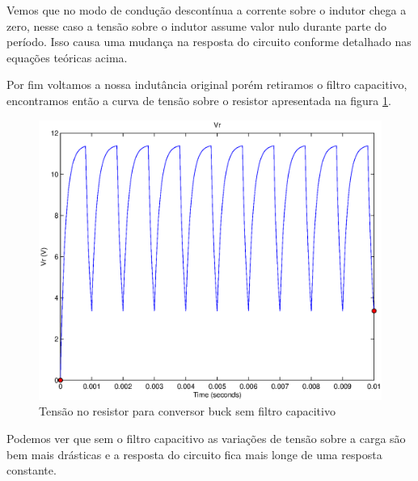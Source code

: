 \documentclass{article}
\begin{document}
Vemos que no modo de condução descontínua a corrente sobre o indutor chega a zero, nesse caso a tensão sobre o indutor assume valor nulo durante parte do período. Isso causa uma mudança na resposta do circuito conforme detalhado nas equações teóricas acima.

Por fim voltamos a nossa indutância original porém retiramos o filtro capacitivo, encontramos então a curva de tensão sobre o resistor apresentada na figura \ref{fig:br3}.
\begin{figure}[H]
	\centering
	\includegraphics[width=0.7\linewidth]{matlab/buck/b_vr3}
	\caption{Tensão no resistor para conversor buck sem filtro capacitivo}
	\label{fig:br3}
\end{figure}

Podemos ver que sem o filtro capacitivo as variações de tensão sobre a carga são bem mais drásticas e a resposta do circuito fica mais longe de uma resposta constante.
\end{document}
